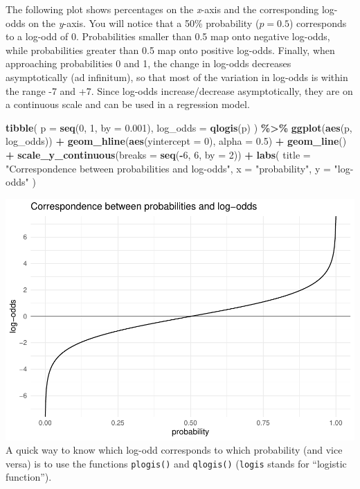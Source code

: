 \documentclass[
]{article}
\newenvironment{Shaded}{\begin{snugshade}}{\end{snugshade}}
\newcommand{\DataTypeTok}[1]{\textcolor[rgb]{0.13,0.29,0.53}{#1}}
\newcommand{\DecValTok}[1]{\textcolor[rgb]{0.00,0.00,0.81}{#1}}
\newcommand{\FloatTok}[1]{\textcolor[rgb]{0.00,0.00,0.81}{#1}}
\newcommand{\KeywordTok}[1]{\textcolor[rgb]{0.13,0.29,0.53}{\textbf{#1}}}
\newcommand{\NormalTok}[1]{#1}
\newcommand{\OperatorTok}[1]{\textcolor[rgb]{0.81,0.36,0.00}{\textbf{#1}}}
\newcommand{\StringTok}[1]{\textcolor[rgb]{0.31,0.60,0.02}{#1}}
\begin{document}
The following plot shows percentages on the \emph{x}-axis and the
corresponding log-odds on the \emph{y}-axis. You will notice that a 50\%
probability (\(p = 0.5\)) corresponds to a log-odd of 0. Probabilities
smaller than 0.5 map onto negative log-odds, while probabilities greater
than 0.5 map onto positive log-odds. Finally, when approaching
probabilities 0 and 1, the change in log-odds decreases asymptotically
(ad infinitum), so that most of the variation in log-odds is within the
range -7 and +7. Since log-odds increase/decrease asymptotically, they
are on a continuous scale and can be used in a regression model.

\begin{Shaded}
\begin{Highlighting}[]
\KeywordTok{tibble}\NormalTok{(}
  \DataTypeTok{p =} \KeywordTok{seq}\NormalTok{(}\DecValTok{0}\NormalTok{, }\DecValTok{1}\NormalTok{, }\DataTypeTok{by =} \FloatTok{0.001}\NormalTok{),}
  \DataTypeTok{log\_odds =} \KeywordTok{qlogis}\NormalTok{(p)}
\NormalTok{) }\OperatorTok{\%\textgreater{}\%}
\StringTok{  }\KeywordTok{ggplot}\NormalTok{(}\KeywordTok{aes}\NormalTok{(p, log\_odds)) }\OperatorTok{+}
\StringTok{  }\KeywordTok{geom\_hline}\NormalTok{(}\KeywordTok{aes}\NormalTok{(}\DataTypeTok{yintercept =} \DecValTok{0}\NormalTok{), }\DataTypeTok{alpha =} \FloatTok{0.5}\NormalTok{) }\OperatorTok{+}
\StringTok{  }\KeywordTok{geom\_line}\NormalTok{() }\OperatorTok{+}
\StringTok{  }\KeywordTok{scale\_y\_continuous}\NormalTok{(}\DataTypeTok{breaks =} \KeywordTok{seq}\NormalTok{(}\OperatorTok{{-}}\DecValTok{6}\NormalTok{, }\DecValTok{6}\NormalTok{, }\DataTypeTok{by =} \DecValTok{2}\NormalTok{)) }\OperatorTok{+}
\StringTok{  }\KeywordTok{labs}\NormalTok{(}
    \DataTypeTok{title =} \StringTok{"Correspondence between probabilities and log{-}odds"}\NormalTok{,}
    \DataTypeTok{x =} \StringTok{"probability"}\NormalTok{,}
    \DataTypeTok{y =} \StringTok{"log{-}odds"}
\NormalTok{  )}
\end{Highlighting}
\end{Shaded}

\includegraphics{bayes-reg-3_files/figure-latex/p-log-odds-1.pdf} A
quick way to know which log-odd corresponds to which probability (and
vice versa) is to use the functions \texttt{plogis()} and
\texttt{qlogis()} (\texttt{logis} stands for ``logistic function'').
\end{document}
